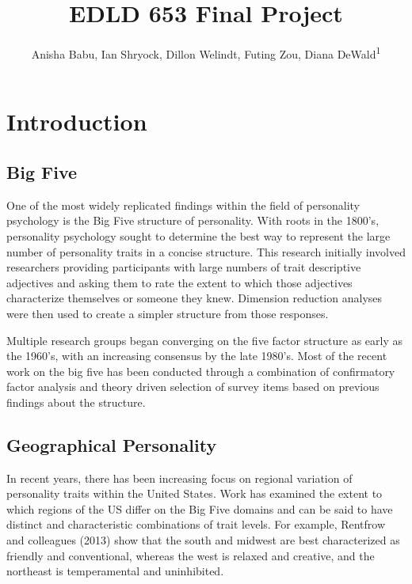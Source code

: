 \documentclass[
  english,
  man]{apa6}
\title{EDLD 653 Final Project}
\author{Anisha Babu, Ian Shryock, Dillon Welindt, Futing Zou, Diana DeWald\textsuperscript{1}}
\date{}
\affiliation{\vspace{0.5cm}\textsuperscript{1} University of Oregon}
\begin{document}
\maketitle

\hypertarget{introduction}{%
\section{Introduction}\label{introduction}}

\hypertarget{big-five}{%
\subsection{Big Five}\label{big-five}}

One of the most widely replicated findings within the field of personality psychology is the Big Five structure of personality. With roots in the 1800's, personality psychology sought to determine the best way to represent the large number of personality traits in a concise structure. This research initially involved researchers providing participants with large numbers of trait descriptive adjectives and asking them to rate the extent to which those adjectives characterize themselves or someone they knew. Dimension reduction analyses were then used to create a simpler structure from those responses.

Multiple research groups began converging on the five factor structure as early as the 1960's, with an increasing consensus by the late 1980's. Most of the recent work on the big five has been conducted through a combination of confirmatory factor analysis and theory driven selection of survey items based on previous findings about the structure.

\hypertarget{geographical-personality}{%
\subsection{Geographical Personality}\label{geographical-personality}}

In recent years, there has been increasing focus on regional variation of personality traits within the United States. Work has examined the extent to which regions of the US differ on the Big Five domains and can be said to have distinct and characteristic combinations of trait levels. For example, Rentfrow and colleagues (2013) show that the south and midwest are best characterized as friendly and conventional, whereas the west is relaxed and creative, and the northeast is temperamental and uninhibited.
\end{document}
